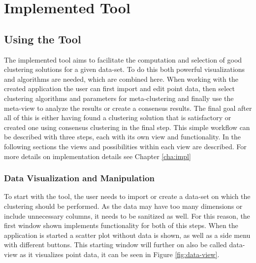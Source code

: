 \documentclass[
	a4paper,
	english,
	twoside,
	openright,               
	11pt                            
	]{report}
\begin{document}
\part{Implemented Tool}
\chapter{Using the Tool}\label{cha:Tool}
The implemented tool aims to facilitate the computation and selection of good clustering solutions for a given data-set. To do this both powerful visualizations and algorithms are needed, which are combined here. When working with the created application the user can first import and edit point data, then select clustering algorithms and parameters for meta-clustering and finally use the meta-view to analyze the results or create a consensus results. The final goal after all of this is either having found a clustering solution that is satisfactory or created one using consensus clustering in the final step. This simple workflow can be described with three steps, each with its own view and functionality. In the following sections the views and possibilities within each view are described. For more details on implementation details see Chapter \ref{cha:impl}

\section{Data Visualization and Manipulation}
To start with the tool, the user needs to import or create a data-set on which the clustering should be performed. As the data may have too many dimensions or include unnecessary columns, it needs to be sanitized as well. For this reason, the first window shown implements functionality for both of this steps. When the application is started a scatter plot without data is shown, as well as a side menu with different buttons. This starting window will further on also be called data-view as it visualizes point data, it can be seen in Figure \ref{fig:data-view}. 
\end{document}
